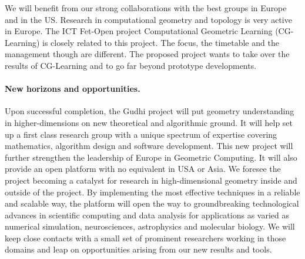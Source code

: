 We will benefit from our strong collaborations with the best groups in Europe and in the US.
Research in computational geometry and topology is very active in  Europe.  The ICT Fet-Open project Computational Geometric Learning (CG-Learning) is closely related to this project. The focus, the timetable and the management though are different. The proposed project wants to take over the results of CG-Learning and to go far beyond prototype developments.  





\paragraph{New horizons and opportunities.} 




Upon successful completion, the Gudhi project will put geometry understanding in higher-dimensions on new theoretical and algorithmic ground. It will help set up a first class research group with a unique spectrum of expertise covering mathematics, algorithm design and software development.
This new project will further strengthen the leadership of Europe  in Geometric Computing.
It will also provide an open platform with no equivalent in USA or Asia.
We foresee the project becoming a catalyst for research in high-dimensional geometry inside and outside of the project.  
By implementing the most effective techniques in a  reliable and scalable way, the platform will
open the way to groundbreaking technological advances in scientific computing and data analysis for applications as varied as numerical simulation, neurosciences, astrophysics and molecular biology. We will keep close contacts with a small set of prominent researchers working in those domains and leap on opportunities arising from our new results and tools. %

